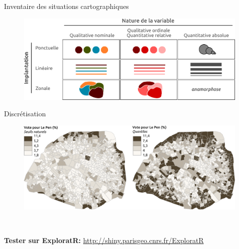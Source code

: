 \begin{frame}{Inventaire des situations cartographiques}

\begin{figure}
\includegraphics[width=12cm]{semio2.pdf}
\end{figure}

\end{frame}


\begin{frame}{Discrétisation}

\begin{figure}
\includegraphics[width=12cm]{Discretisation.pdf}
\end{figure}

~

\textbf{Tester sur ExploratR:} \url{http://shiny.parisgeo.cnrs.fr/ExploratR}

\end{frame}


